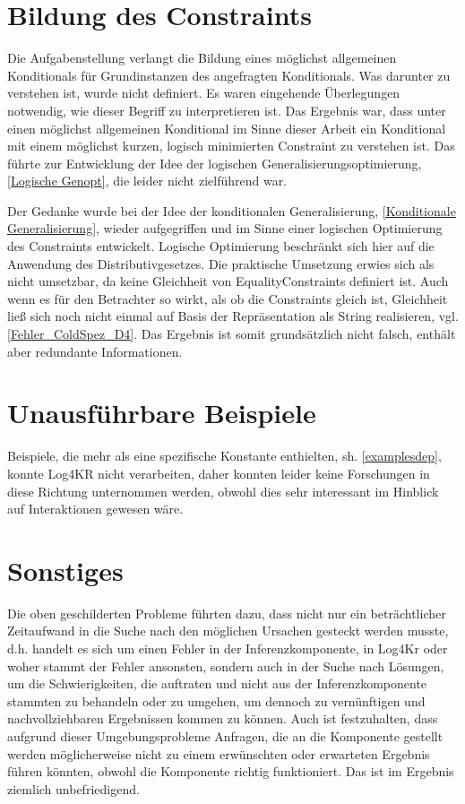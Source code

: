 \documentclass[a4paper, 11pt]{book}
\begin{document}
{\section{Bildung des Constraints}
Die Aufgabenstellung verlangt die Bildung eines möglichst allgemeinen Konditionals für Grundinstanzen des angefragten Konditionals. Was darunter zu verstehen ist, wurde nicht definiert. Es waren eingehende Überlegungen notwendig, wie dieser Begriff zu interpretieren ist. Das Ergebnis war, dass unter einen möglichst allgemeinen Konditional im Sinne dieser Arbeit ein Konditional mit einem möglichst kurzen, logisch minimierten Constraint zu verstehen ist. Das führte zur Entwicklung der Idee der logischen Generalisierungsoptimierung, \ref{Logische Genopt}, die leider nicht zielführend war. 

Der Gedanke wurde bei der Idee der konditionalen Generalisierung, \ref{Konditionale Generalisierung}, wieder aufgegriffen und im Sinne einer logischen Optimierung des Constraints entwickelt. Logische Optimierung beschränkt sich hier auf die Anwendung des Distributivgesetzes. Die praktische Umsetzung erwies sich als nicht umsetzbar, da keine Gleichheit von EqualityConstraints definiert ist. Auch wenn es für den Betrachter so wirkt, als ob die Constraints gleich ist, Gleichheit ließ sich noch nicht einmal auf Basis der Repräsentation als String realisieren, vgl. \ref{Fehler_ColdSpez_D4}. Das Ergebnis ist somit grundsätzlich nicht falsch, enthält aber redundante Informationen.  


\section{Unausführbare Beispiele} \label{Beispiele unausfuehrbar} 
Beispiele, die mehr als eine spezifische Konstante enthielten, sh. \ref{examplesdep}, konnte Log4KR nicht verarbeiten, daher konnten leider keine Forschungen in diese Richtung unternommen werden, obwohl dies sehr interessant im Hinblick auf Interaktionen gewesen wäre. 

\section{Sonstiges}
Die oben geschilderten Probleme führten dazu, dass nicht nur ein beträchtlicher Zeitaufwand in die Suche nach den möglichen Ursachen gesteckt werden musste, d.h. handelt es sich um einen Fehler in der Inferenzkomponente, in Log4Kr oder woher stammt der Fehler ansonsten, sondern auch in der Suche nach Lösungen, um die Schwierigkeiten, die auftraten und nicht aus der Inferenzkomponente stammten zu behandeln oder zu umgehen, um dennoch zu vernünftigen und nachvollziehbaren Ergebnissen kommen zu können. 
Auch ist festzuhalten, dass aufgrund dieser Umgebungsprobleme Anfragen, die an die Komponente gestellt werden möglicherweise nicht zu einem erwünschten oder erwarteten Ergebnis führen könnten, obwohl die Komponente richtig funktioniert. Das ist im Ergebnis ziemlich unbefriedigend. 

}
\end{document}
